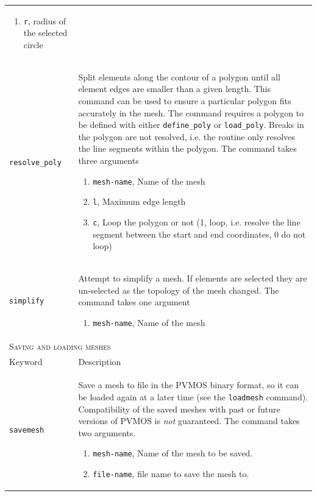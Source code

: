 \documentclass[noshowpacs,preprintnumbers,amsmath,amssymb, letter]{revtex4}
\begin{document}
\begin{longtable}{p{}p{}}
\begin{enumerate}
\item \texttt{r}, radius of the selected circle
\end{enumerate}\\
\texttt{resolve\_poly}	& Split elements along the contour of a polygon until all element edges are smaller than a given length. This command can be used to ensure a particular polygon fits accurately in the mesh. The command requires a polygon to be defined with either \texttt{define\_poly} or \texttt{load\_poly}. Breaks in the polygon are not resolved, i.e. the routine only resolves the line segments within the polygon. The command takes three arguments 
\begin{enumerate}
\item \texttt{mesh-name}, Name of the mesh
\item \texttt{l}, Maximum edge length
\item \texttt{c}, Loop the polygon or not (1, loop, i.e. resolve the line segment between the start and end coordinates, 0 do not loop)
\end{enumerate}\\
\texttt{simplify}	&  Attempt to simplify a mesh. If elements are selected they are un-selected as the topology of the mesh changed. The command takes one argument 
\begin{enumerate}
\item \texttt{mesh-name}, Name of the mesh
\end{enumerate}\\
\multicolumn{2}{l}{\textsc{Saving and loading meshes}} \\*
\hline
Keyword & Description \\
\texttt{savemesh}	& Save a mesh to file in the PVMOS binary format, so it can be loaded again at a later time (see the \texttt{loadmesh} command). Compatibility of the saved meshes with past or future versions of PVMOS is \emph{not} guaranteed. The command takes two arguments.
\begin{enumerate}
\item \texttt{mesh-name}, Name of the mesh to be saved.
\item \texttt{file-name}, file name to save the mesh to.
\end{enumerate}\\

\end{longtable}
\end{document}
